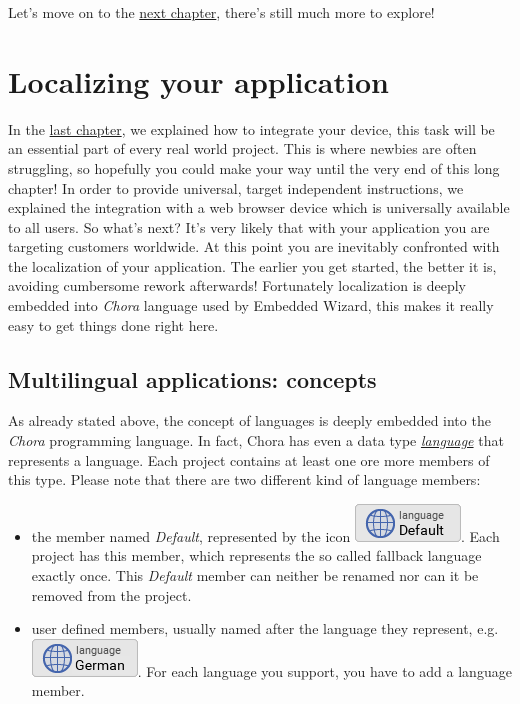 \documentclass[
  a4paper,
,tablecaptionabove
]{scrbook}
\begin{document}
Let's move on to the \href{:LocalizingYourApplication.xml}{next
chapter}, there's still much more to explore!

\chapter{Localizing your application}


In the \href{:DeviceIntegrationBrowser.xml}{last chapter}, we explained
how to integrate your device, this task will be an essential part of
every real world project. This is where newbies are often struggling, so
hopefully you could make your way until the very end of this long
chapter! In order to provide universal, target independent instructions,
we explained the integration with a web browser device which is
universally available to all users. So what's next? It's very likely
that with your application you are targeting customers worldwide. At
this point you are inevitably confronted with the localization of your
application. The earlier you get started, the better it is, avoiding
cumbersome rework afterwards! Fortunately localization is deeply
embedded into \emph{Chora} language used by Embedded Wizard, this makes
it really easy to get things done right here.


\hypertarget{_multilingual_applications_concepts}{%
\section{Multilingual applications:
concepts}\label{_multilingual_applications_concepts}}

As already stated above, the concept of languages is deeply embedded
into the \emph{Chora} programming language. In fact, Chora has even a
data type
\emph{\href{https://doc.embedded-wizard.de/language-type}{language}}
that represents a language. Each project contains at least one ore more
members of this type. Please note that there are two different kind of
language members:

\begin{itemize}
\item
  the member named \emph{Default}, represented by the icon
  \includegraphics{./../asciidoc/modules/ROOT/assets/images/icons/DefaultLanguageIcon.png}.
  Each project has this member, which represents the so called fallback
  language exactly once. This \emph{Default} member can neither be
  renamed nor can it be removed from the project.
\item
  user defined members, usually named after the language they represent,
  e.g.
  \includegraphics{./../asciidoc/modules/ROOT/assets/images/icons/GermanLanguageIcon.png}.
  For each language you support, you have to add a language member.
\end{itemize}
\end{document}
